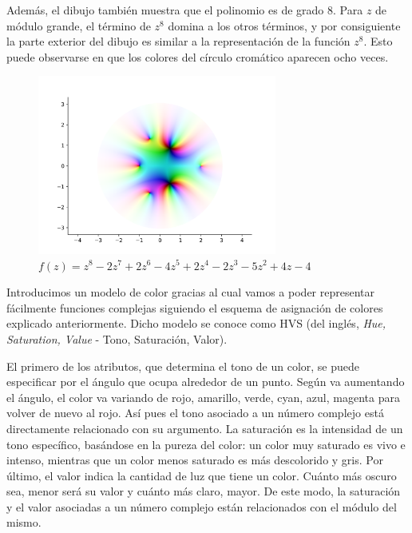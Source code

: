 Además, el dibujo también muestra que el polinomio es de grado $8$. Para $z$ de módulo grande, el término de $z^8$ domina a los otros términos, y por consiguiente la parte exterior del dibujo es similar a la representación de la función $z^8$. Esto puede observarse en que los colores del círculo cromático aparecen ocho veces. \\

\begin{figure}[!htbp]
    \centering
    \includegraphics[width=0.7\textwidth]{../Aplicacion/z^8-2z^7+2z^6-4z^5+2z^4-2z^3-5z^2+4z-4.png}
    \caption{$f(z) = z^8-2z^7+2z^6-4z^5+2z^4-2z^3-5z^2+4z-4$}
    \label{fig:z^8-2z^7+2z^6-4z^5+2z^4-2z^3-5z^2+4z-4}
\end{figure}

Introducimos un modelo de color gracias al cual vamos a poder representar fácilmente funciones complejas siguiendo el esquema de asignación de colores explicado anteriormente. Dicho modelo se conoce como HVS (del inglés, \textit{Hue, Saturation, Value} - Tono, Saturación, Valor). \\


El primero de los atributos, que determina el tono de un color, se puede especificar por el ángulo que ocupa alrededor de un punto. Según va aumentando el ángulo, el color va variando de rojo, amarillo, verde, cyan, azul, magenta para volver de nuevo al rojo. Así pues el tono asociado a un número complejo está directamente relacionado con su argumento. La saturación es la intensidad de un tono específico, basándose en la pureza del color: un color muy saturado es vivo e intenso, mientras que un color menos saturado es más descolorido y gris. Por último, el valor indica la cantidad de luz que tiene un color. Cuánto más oscuro sea, menor será su valor y cuánto más claro, mayor. De este modo, la saturación y el valor asociadas a un número complejo están relacionados con el módulo del mismo. \\

